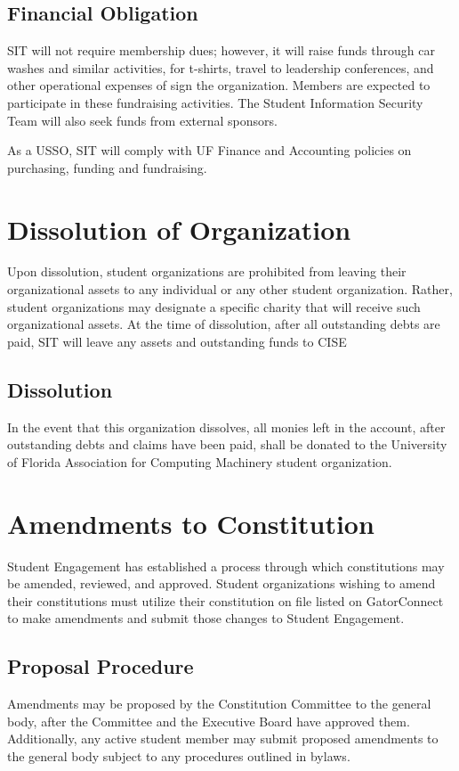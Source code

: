\documentclass{article}
\def\clubname{SIT }
\def\clubfullname{Student Information Security Team }
\begin{document}
\subsection{Financial Obligation}
\clubname will not require membership dues; however, it will raise funds through car washes and similar activities, for t-shirts, travel to leadership conferences, and other operational expenses of sign the organization. Members are expected to participate in these fundraising activities. The \clubfullname will also seek funds from external sponsors.

As a USSO, \clubname will comply with UF Finance and Accounting policies on purchasing, funding and fundraising.


\section{Dissolution of Organization}
Upon dissolution, student organizations are prohibited from leaving their organizational assets to any individual or any other student organization. Rather, student organizations may designate a specific charity that will receive such organizational assets. At the time of dissolution, after all outstanding debts are paid, \clubname will leave any assets and outstanding funds to CISE

\subsection{Dissolution}
In the event that this organization dissolves, all monies left in the account, after outstanding debts and claims have been paid, shall be donated to the University of Florida Association for Computing Machinery student organization.

\section{Amendments to Constitution}
Student Engagement has established a process through which constitutions may be amended, reviewed, and approved. Student organizations wishing to amend their constitutions must utilize their constitution on file listed on GatorConnect to make amendments and submit those changes to Student Engagement.

\subsection{Proposal Procedure}
Amendments may be proposed by the Constitution Committee to the general body, after the Committee and the Executive Board have approved them. Additionally, any active student member may submit proposed amendments to the general body subject to any procedures outlined in bylaws.
\end{document}
